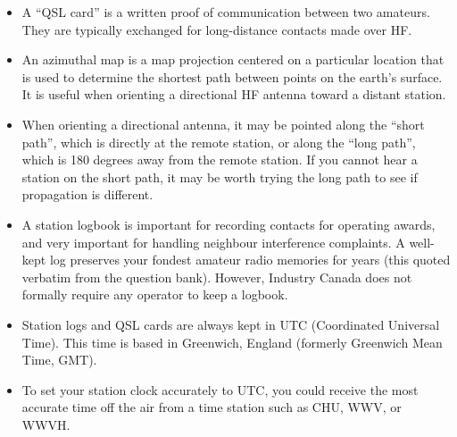 \documentclass[letterpaper,12pt]{scrartcl}
\begin{document}
\begin{itemize}
\item A ``QSL card'' is a written proof of communication between two amateurs. They are typically exchanged for long-distance contacts made over HF.
\item An azimuthal map is a map projection centered on a particular location that is used to determine the shortest path between points on the earth's surface.
It is useful when orienting a directional HF antenna toward a distant station.
\item When orienting a directional antenna, it may be pointed along the ``short path'', which is directly at the remote station,
or along the ``long path'', which is 180 degrees away from the remote station.
If you cannot hear a station on the short path, it may be worth trying the long path to see if propagation is different.
\item A station logbook is important for recording contacts for operating awards, and very important for handling neighbour interference complaints.
A well-kept log preserves your fondest amateur radio memories for years (this quoted verbatim from the question bank).
However, Industry Canada does not formally require any operator to keep a logbook.
\item Station logs and QSL cards are always kept in UTC (Coordinated Universal Time). This time is based in Greenwich, England (formerly Greenwich Mean Time, GMT).
\item To set your station clock accurately to UTC, you could receive the most accurate time off the air from
a time station such as CHU, WWV, or WWVH.
\end{itemize}
\end{document}
